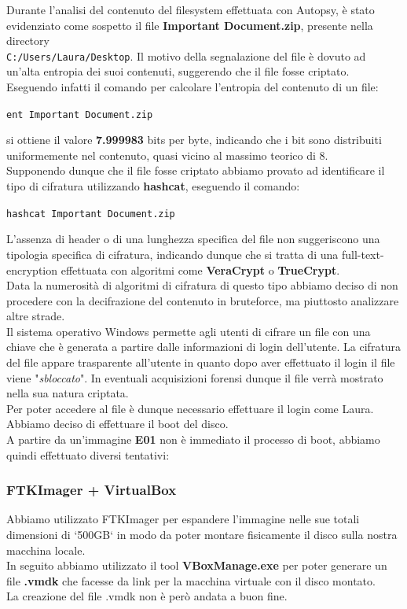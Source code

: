 Durante l'analisi del contenuto del filesystem effettuata con Autopsy, è stato evidenziato come sospetto il file \textbf{Important Document.zip}, presente nella directory\\
\texttt{C:/Users/Laura/Desktop}. Il motivo della segnalazione del file è dovuto ad un'alta entropia dei suoi contenuti, suggerendo che il file fosse criptato.\\
Eseguendo infatti il comando per calcolare l'entropia del contenuto di un file:
\begin{center}
    \texttt{ent Important Document.zip}
\end{center}
si ottiene il valore \textbf{7.999983} bits per byte, indicando che i bit sono distribuiti uniformemente nel contenuto, quasi vicino al massimo teorico di 8.\vspace{14pt}\\
Supponendo dunque che il file fosse criptato abbiamo provato ad identificare il tipo di cifratura utilizzando \textbf{hashcat}, eseguendo il comando:
\begin{center}
    \texttt{hashcat Important Document.zip}
\end{center}
L'assenza di header o di una lunghezza specifica del file non suggeriscono una tipologia specifica di cifratura, indicando dunque che si tratta di una full-text-encryption effettuata con algoritmi come \textbf{VeraCrypt} o \textbf{TrueCrypt}.\\
Data la numerosità di algoritmi di cifratura di questo tipo abbiamo deciso di non procedere con la decifrazione del contenuto in bruteforce, ma piuttosto analizzare altre strade.\vspace{14pt}\\
Il sistema operativo Windows permette agli utenti di cifrare un file con una chiave che è generata a partire dalle informazioni di login dell'utente. La cifratura del file appare trasparente all'utente in quanto dopo aver effettuato il login il file viene "\textit{sbloccato}". In eventuali acquisizioni forensi dunque il file verrà mostrato nella sua natura criptata.\vspace{14pt}\\
Per poter accedere al file è dunque necessario effettuare il login come Laura. Abbiamo deciso di effettuare il boot del disco.\vspace{14pt}\\
A partire da un'immagine \textbf{E01} non è immediato il processo di boot, abbiamo quindi effettuato diversi tentativi:
\subsubsection{FTKImager + VirtualBox}
Abbiamo utilizzato FTKImager per espandere l'immagine nelle sue totali dimensioni di `500GB` in modo da poter montare fisicamente il disco sulla nostra macchina locale.\\
In seguito abbiamo utilizzato il tool \textbf{VBoxManage.exe} per poter generare un file \textbf{.vmdk} che facesse da link per la macchina virtuale con il disco montato.\\
La creazione del file .vmdk non è però andata a buon fine.
